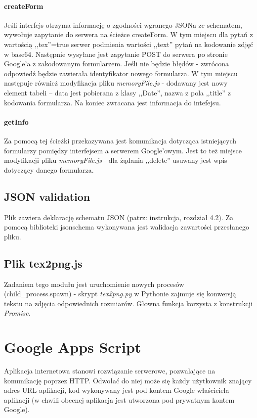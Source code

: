 \paragraph{createForm} Jeśli interfejs otrzyma informację o zgodności wgranego JSONa ze schematem, wywołuje zapytanie do serwera na ścieżce createForm. W tym miejscu dla pytań z wartością ,,tex''=true serwer podmienia wartości ,,text'' pytań na kodowanie zdjęć w base64. Następnie wysyłane jest zapytanie POST do serwera po stronie Google'a z zakodowanym formularzem. Jeśli nie będzie błędów - zwrócona odpowiedź będzie zawierała identyfikator nowego formularza. W tym miejscu następuje również modyfikacja pliku \textit{memoryFile.js} - dodawany jest nowy element tabeli -- data jest pobierana z klasy ,,Date'', nazwa z pola ,,title'' z kodowania formularza. Na koniec zwracana jest informacja do intefejsu.
\paragraph{getInfo} Za pomocą tej ścieżki  przekazywana jest komunikacja dotycząca istniejących formularzy pomiędzy interfejsem a serwerem Google'owym. Jest to też miejsce modyfikacji pliku \textit{memoryFile.js} - dla żądania ,,delete'' usuwany jest wpis dotyczący danego formularza.
\subsection{JSON validation} Plik zawiera deklarację schematu JSON (patrz: instrukcja, rozdział 4.2). Za pomocą biblioteki jsonschema wykonywana jest walidacja zawartości przesłanego pliku.
\subsection{Plik tex2png.js} Zadaniem tego modułu jest uruchomienie nowych procesów (child\_process.spawn)  - skrypt \textit{tex2png.py} w Pythonie zajmuje się konwersją tekstu na zdjęcia odpowiednich rozmiarów. Głowna funkcja korzysta z konstrukcji \textit{Promise}.

\section{Google Apps Script}
Aplikacja internetowa stanowi rozwiązanie serwerowe, pozwalające na komunikację poprzez HTTP. Odwołać do niej może się każdy użytkownik znający adres URL aplikacji, kod wykonywany jest pod kontem Google właściciela aplikacji (w chwili obecnej aplikacja jest utworzona pod prywatnym kontem Google).

